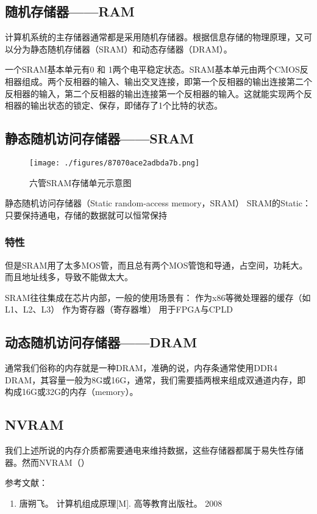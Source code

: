 
\begin{issues}
\issueDraft
\end{issues}

\subsection{随机存储器——RAM}


计算机系统的主存储器通常都是采用随机存储器。根据信息存储的物理原理，又可以分为静态随机存储器（SRAM）和动态存储器（DRAM）。

一个SRAM基本单元有0 和 1两个电平稳定状态。SRAM基本单元由两个CMOS反相器组成。两个反相器的输入、输出交叉连接，即第一个反相器的输出连接第二个反相器的输入，第二个反相器的输出连接第一个反相器的输入。这就能实现两个反相器的输出状态的锁定、保存，即储存了1个比特的状态。

\subsection{静态随机访问存储器——SRAM}

\begin{figure}[ht]
\centering
\texttt{[image: ./figures/87070ace2adbda7b.png]}
\caption{六管SRAM存储单元示意图} \label{fig_RAM_3}
\end{figure}


静态随机访问存储器（Static random-access memory，SRAM）
SRAM的Static：只要保持通电，存储的数据就可以恒常保持

\subsubsection{特性}

但是SRAM用了太多MOS管，而且总有两个MOS管饱和导通，占空间，功耗大。而且地址线多，导致不能做太大。

SRAM往往集成在芯片内部，一般的使用场景有：
作为x86等微处理器的缓存（如L1、L2、L3）
作为寄存器（寄存器堆）
用于FPGA与CPLD

\subsection{动态随机访问存储器——DRAM}

通常我们俗称的内存就是一种DRAM，准确的说，内存条通常使用DDR4 DRAM，其容量一般为8G或16G，通常，我们需要插两根来组成双通道内存，即构成16G或32G的内存（memory）。


\subsection{NVRAM}

我们上述所说的内存介质都需要通电来维持数据，这些存储器都属于易失性存储器。然而NVRAM（）



参考文献：
\begin{enumerate}
\item 唐朔飞。 计算机组成原理[M]. 高等教育出版社。 2008
\end{enumerate}
